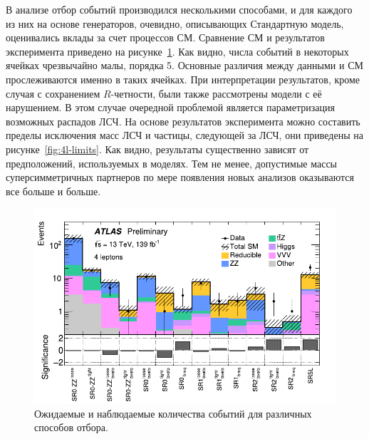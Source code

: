 \documentclass[a4paper, 10pt, twocolumn]{article}
\begin{document}
В анализе отбор событий производился несколькими способами, и для 
каждого из них на основе генераторов, очевидно, описывающих Стандартную 
модель, оценивались вклады за счет процессов СМ. Сравнение СМ 
и результатов эксперимента приведено на рисунке~\ref{fig:4l-events}. 
Как видно, числа событий в некоторых ячейках чрезвычайно малы, порядка 
5. Основные различия между данными и СМ прослеживаются именно в таких 
ячейках. При интерпретации результатов, кроме случая с сохранением 
$R$-четности, были также рассмотрены модели с её нарушением. В этом 
случае очередной проблемой является параметризация возможных распадов 
ЛСЧ. На основе результатов эксперимента можно составить пределы 
исключения масс ЛСЧ и частицы, следующей за ЛСЧ, они приведены на 
рисунке~\ref{fig:4l-limits}. Как видно, результаты существенно зависят 
от предположений, используемых в моделях. Тем не менее, допустимые 
массы суперсимметричных партнеров по мере появления новых анализов 
оказываются все больше и больше.

\begin{figure}[p]%
	\centering
	\includegraphics[width=\linewidth]{figures/4lepton-events}
	\caption{Ожидаемые и наблюдаемые количества событий для различных 
	способов отбора.}
	\label{fig:4l-events}
\end{figure}%
\end{document}
